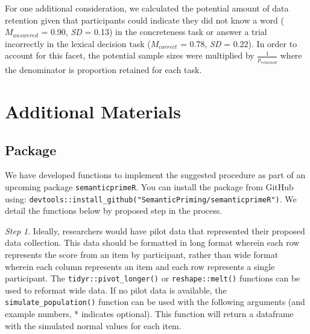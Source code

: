 \documentclass[
  man]{apa7}
\begin{document}
For one additional consideration, we calculated the potential amount of data retention given that participants could indicate they did not know a word (\(M_{answered}\) = 0.90, \emph{SD} = 0.13) in the concreteness task or answer a trial incorrectly in the lexical decision task (\(M_{correct}\) = 0.78, \emph{SD} = 0.22). In order to account for this facet, the potential sample sizes were multiplied by \(\frac{1}{p_{retained}}\) where the denominator is proportion retained for each task.

\hypertarget{additional-materials}{%
\section{Additional Materials}\label{additional-materials}}

\hypertarget{package}{%
\subsection{Package}\label{package}}

We have developed functions to implement the suggested procedure as part of an upcoming package \texttt{semanticprimeR}. You can install the package from GitHub using: \texttt{devtools::install\_github("SemanticPriming/semanticprimeR")}. We detail the functions below by proposed step in the process.

\emph{Step 1}. Ideally, researchers would have pilot data that represented their proposed data collection. This data should be formatted in long format wherein each row represents the score from an item by participant, rather than wide format wherein each column represents an item and each row represents a single participant. The \texttt{tidyr::pivot\_longer()} or \texttt{reshape::melt()} functions can be used to reformat wide data. If no pilot data is available, the \texttt{simulate\_population()} function can be used with the following arguments (and example numbers, * indicates optional). This function will return a dataframe with the simulated normal values for each item.
\end{document}
